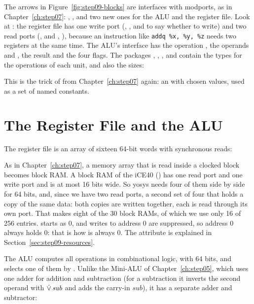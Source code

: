 The arrows in Figure~\ref{fig:step09-blocks} are interfaces with modports, as
in Chapter~\ref{ch:step07}: , , and two new ones for the
ALU and the register file. Look at : the register file has
one write port (, , and  to say whether to
write) and two read ports (,  and
, ), because an instruction like \texttt{addq
\%x, \%y, \%z} needs two registers at the same time. The ALU's interface
 has the operation , the operands  and , the
result  and the four flags. The packages , ,
,  and  contain the  types for the
operations of each unit, and  also the sizes:


This is the trick of  from Chapter~\ref{ch:step07} again: an
 with chosen values, used as a set of named constants.

\section{The Register File and the ALU}
\label{sec:step09-rf-alu}

The register file is an array of sixteen 64-bit words with synchronous reads:


As in Chapter~\ref{ch:step07}, a memory array that is read inside a clocked
block becomes block RAM. A block RAM of the iCE40 () has one
read port and one write port and is at most 16 bits wide. So yosys needs four
of them side by side for 64 bits, and, since we have two read ports, a second
set of four that holds a copy of the same data: both copies are written
together, each is read through its own port. That makes eight of the 30 block
RAMs, of which we use only 16 of 256 entries.  starts as 0, and
writes to address 0 are suppressed, so address 0 always holds 0: that is how
 is always 0. The attribute  is explained in
Section~\ref{sec:step09-resources}.

The ALU computes all operations in combinational logic, with 64 bits, and
selects one of them by . Unlike the Mini-ALU of
Chapter~\ref{ch:step05}, which uses one adder for addition and subtraction (for a
subtraction it inverts the second operand with $\mathbin{\dot{\lor}}\,\mathit{sub}$ and adds
the carry-in $\mathit{sub}$), it has a separate adder and subtractor:


